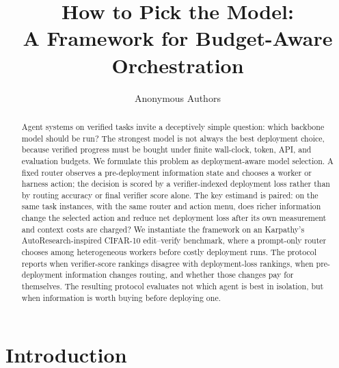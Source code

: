 \documentclass{article}
\title{How to Pick the Model:\\
A Framework for Budget-Aware Orchestration}
\author{Anonymous Authors}
\begin{document}
\maketitle

\begin{abstract}
Agent systems on verified tasks invite a deceptively simple question: which backbone model should be run? The strongest model is not always the best deployment choice, because verified progress must be bought under finite wall-clock, token, API, and evaluation budgets. We formulate this problem as deployment-aware model selection. A fixed router observes a pre-deployment information state and chooses a worker or harness action; the decision is scored by a verifier-indexed deployment loss rather than by routing accuracy or final verifier score alone. The key estimand is paired: on the same task instances, with the same router and action menu, does richer information change the selected action and reduce net deployment loss after its own measurement and context costs are charged? We instantiate the framework on an Karpathy's AutoResearch-inspired CIFAR-10 edit--verify benchmark, where a prompt-only router chooses among heterogeneous workers before costly deployment runs. The protocol reports when verifier-score rankings disagree with deployment-loss rankings, when pre-deployment information changes routing, and whether those changes pay for themselves. The resulting protocol evaluates not which agent is best in isolation, but when information is worth buying before deploying one.
\end{abstract}

\section{Introduction}
\label{sec:intro}
\end{document}
